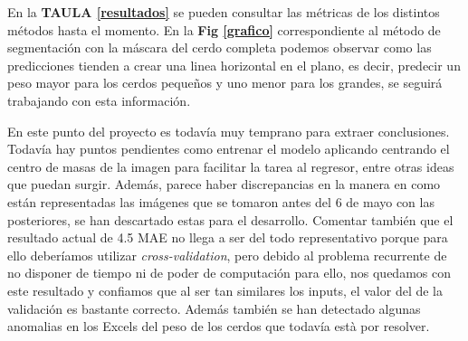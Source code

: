 \documentclass[12pt,a4paper]{article}
\begin{document}
En la \textbf{TAULA \ref{resultados}} se pueden consultar las métricas de los distintos métodos hasta el momento. En la \textbf{Fig \ref{grafico}} correspondiente al método de segmentación con la máscara del cerdo completa podemos observar como las predicciones tienden a crear una linea horizontal en el plano, es decir, predecir un peso mayor para los cerdos pequeños y uno menor para los grandes, se seguirá trabajando con esta información.



En este punto del proyecto es todavía muy temprano para extraer conclusiones.
Todavía hay puntos pendientes como entrenar el modelo aplicando centrando el centro de masas de la imagen para facilitar la tarea al regresor, entre otras ideas que puedan surgir.
Además, parece haber discrepancias en la manera en como están representadas las imágenes que se tomaron antes del 6 de mayo con las posteriores, se han descartado estas para el desarrollo.
Comentar también que el resultado actual de 4.5 MAE no llega a ser del todo representativo porque para ello deberíamos utilizar \textit{cross-validation}, pero debido al problema recurrente de no disponer de tiempo ni de poder de computación para ello, nos quedamos con este resultado y confiamos que al ser tan similares los inputs, el valor del de la validación es bastante correcto. Además también se han detectado algunas anomalias en los Excels del peso de los cerdos que todavía està por resolver.
\end{document}
